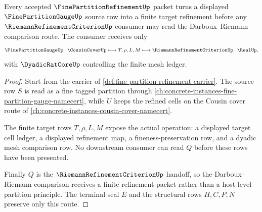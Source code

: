 \begin{theorem}
\label{thm:fine-partition-refinement-handoff}
Every accepted $\FinePartitionRefinementUp$ packet turns a displayed $\FinePartitionGaugeUp$ source row into a finite target refinement before any $\RiemannRefinementCriterionUp$ consumer may read the Darboux--Riemann comparison route. The consumer receives only
$$
\FinePartitionGaugeUp,\ \CousinCoverUp
\longmapsto T,\rho,L,M
\longmapsto \RiemannRefinementCriterionUp,\ \RealUp ,
$$
with $\DyadicRatCoreUp$ controlling the finite mesh ledger.
\end{theorem}
\begin{proof}
Start from the carrier of \autoref{def:fine-partition-refinement-carrier}. The source row $S$ is read as a fine tagged partition through \autoref{ch:concrete-instances-fine-partition-gauge-namecert}, while $U$ keeps the refined cells on the Cousin cover route of \autoref{ch:concrete-instances-cousin-cover-namecert}.

The finite target rows $T,\rho,L,M$ expose the actual operation: a displayed target cell ledger, a displayed refinement map, a fineness-preservation row, and a dyadic mesh comparison row. No downstream consumer can read $Q$ before these rows have been presented.

Finally $Q$ is the $\RiemannRefinementCriterionUp$ handoff, so the Darboux--Riemann comparison receives a finite refinement packet rather than a host-level partition principle. The terminal seal $E$ and the structural rows $H,C,P,N$ preserve only this route.
\end{proof}




